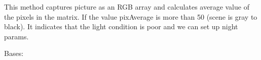\documentclass[letterpaper,10pt,english,openany]{sphinxmanual}
\begin{document}
\begin{fulllineitems}
\begin{fulllineitems}
\begin{description}
\end{description}

\end{fulllineitems}


\begin{fulllineitems}
\label{rpicameramon:rpicameramon.motion.CaptureHandler.scan_day}
This method captures picture as an RGB array and calculates
average value of the pixels in the matrix.
If the value pixAverage is more than 50 (scene is gray to black).
It indicates that the light condition is poor and we can set up night
params.

\end{fulllineitems}


\end{fulllineitems}


\begin{fulllineitems}
\label{rpicameramon:rpicameramon.motion.SMSHandler}
Bases: 

\begin{fulllineitems}
\label{rpicameramon:rpicameramon.motion.SMSHandler.handle_sms}
\end{fulllineitems}


\end{fulllineitems}

\end{document}
